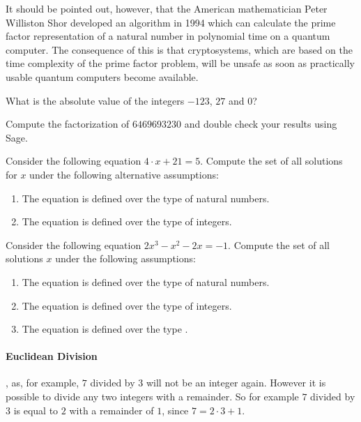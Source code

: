 It should be pointed out, however, that the American mathematician Peter Williston Shor developed an algorithm in 1994 which can calculate the prime factor representation of a natural number in polynomial time on a quantum computer. The consequence of this is that cryptosystems, which are based on the time complexity of the prime factor problem, will be unsafe as soon as practically usable quantum computers become available.  

\begin{exercise}
What is the absolute value of the integers $-123$, $27$ and $0$?
\end{exercise}
\begin{exercise}
Compute the factorization of $6469693230$ and double check your results using Sage.
\end{exercise}
\begin{exercise}
Consider the following equation $4\cdot x + 21 = 5$. Compute the set of all solutions for $x$ under the following alternative assumptions: 
\begin{enumerate}
\item The equation is defined over the type of natural numbers. 
\item The equation is defined over the type of integers.
\end{enumerate}
\end{exercise}
\begin{exercise}
Consider the following equation $2 x^3 - x^2 - 2 x = - 1$. Compute the set of all solutions $x$ under the following assumptions: 
\begin{enumerate}
\item The equation is defined over the type of natural numbers. 
\item The equation is defined over the type of integers.
\item The equation is defined over the type .
\end{enumerate}
\end{exercise}

\paragraph{Euclidean Division}
\label{Euclidean_division}
, as, for example, $7$ divided by $3$ will not be an integer again. However it is possible to divide any two integers with a remainder. So for example $7$ divided by $3$ is equal to $2$ with a remainder of $1$, since $7 = 2\cdot 3 + 1$. 

